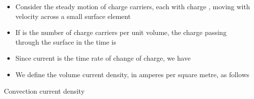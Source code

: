 \ELhold


\begin{ELunit}


\begin{itemize}
\tightlist
\item
  Consider the steady motion of charge carriers, each with charge , moving with velocity  across a small surface element 
\item
  If  is the number of charge carriers per unit volume, the charge passing through the surface  in the time  is
\end{itemize}


\begin{itemize}
\tightlist
\item
  Since current is the time rate of change of charge, we have
\end{itemize}


\begin{itemize}
\tightlist
\item
  We define the volume current density, in amperes per square metre, as follows
\end{itemize}


\end{ELunit}

\begin{ELimportant}{Convection current density}


\end{ELimportant}

